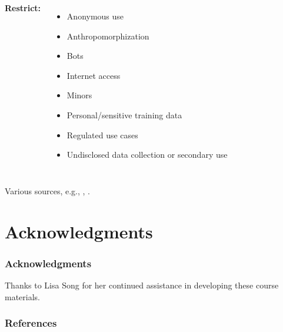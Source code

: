\documentclass[11pt,
               aspectratio=169,
               hyperref={colorlinks}
               ]{beamer}
\begin{document}
\begin{frame}[t]
\begin{columns}
					\textbf{Restrict:}
					\begin{itemize}\tiny
						\item Anonymous use
						\item Anthropomorphization 
						\item Bots
						\item Internet access
						\item Minors
						\item Personal/sensitive training data
						\item Regulated use cases
						\item Undisclosed data collection or secondary use
					\end{itemize}
					\vspace{5pt}
					
			\end{columns}
			\vspace{10pt}
			\tiny{Various sources, e.g., \cite{weidinger2022taxonomy}, \cite{ai2024artificial}.}
					
		\end{frame}	

	\section{Acknowledgments} 
	
		\begin{frame}
			
			\frametitle{Acknowledgments}
			
			Thanks to Lisa Song for her continued assistance in developing these course materials.
			
		\end{frame}	


		
		\begin{frame}[t, allowframebreaks]
		
			\frametitle{References}	
					
			\printbibliography
			
		\end{frame}
\end{document}
